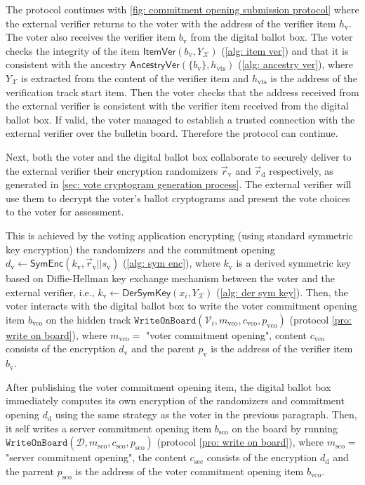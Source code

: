 The protocol continues with \cref{fig: commitment opening submission protocol} where the external verifier returns to the voter with the address of the verifier item $h_\mathrm{v}$. The voter also receives the verifier item $b_\mathrm{v}$ from the digital ballot box. The voter checks the integrity of the item $\mathsf{ItemVer}(b_\mathrm{v}, Y_\mathcal{X})$ (\cref{alg: item ver}) and that it is consistent with the ancestry $\mathsf{AncestryVer}(\{ b_\mathrm{v} \}, h_\mathrm{vts})$ (\cref{alg: ancestry ver}), where $Y_\mathcal{X}$ is extracted from the content of the verifier item and $h_\mathrm{vts}$ is the address of the verification track start item. Then the voter checks that the address received from the external verifier is consistent with the verifier item received from the digital ballot box. If valid, the voter managed to establish a trusted connection with the external verifier over the bulletin board. Therefore the protocol can continue.

Next, both the voter and the digital ballot box collaborate to securely deliver to the external verifier their encryption randomizers $\vec{r}_\mathrm{v}$ and $\vec{r}_\mathrm{d}$ respectively, as generated in \cref{sec: vote cryptogram generation process}. The external verifier will use them to decrypt the voter's ballot cryptograms and present the vote choices to the voter for assessment.

This is achieved by the voting application encrypting (using standard symmetric key encryption) the randomizers and the commitment opening $d_\mathrm{v} \gets \mathsf{SymEnc}(k_\mathrm{v}, \vec{r}_\mathrm{v} || s_\mathrm{v})$ (\cref{alg: sym enc}), where $k_\mathrm{v}$ is a derived symmetric key based on Diffie-Hellman key exchange mechanism between the voter and the external verifier, i.e., $k_\mathrm{v} \gets \mathsf{DerSymKey}(x_i, Y_\mathcal{X})$ (\cref{alg: der sym key}). Then, the voter interacts with the digital ballot box to write the voter commitment opening item $b_\mathrm{vco}$ on the hidden track $\mathtt{WriteOnBoard}(\mathcal{V}_i, m_\mathrm{vco}, c_\mathrm{vco}, p_\mathrm{vco})$ (protocol \ref{pro: write on board}), where $m_\mathrm{vco} = $ "voter commitment opening", content $c_\mathrm{vco}$ consists of the encryption $d_\mathrm{v}$ and the parent $p_\mathrm{v}$ is the address of the verifier item $b_\mathrm{v}$.

After publishing the voter commitment opening item, the digital ballot box immediately computes its own encryption of the randomizers and commitment opening $d_\mathrm{d}$ using the same strategy as the voter in the previous paragraph. Then, it self writes a server commitment opening item $b_\mathrm{sco}$ on the board by running $\mathtt{WriteOnBoard}(\mathcal{D}, m_\mathrm{sco}, c_\mathrm{sco}, p_\mathrm{sco})$ (protocol \ref{pro: write on board}), where $m_\mathrm{sco} =$ "server commitment opening", the content $c_\mathrm{sec}$ consists of the encryption $d_\mathrm{d}$ and the parrent $p_\mathrm{sco}$ is the address of the voter commitment opening item $b_\mathrm{vco}$. 

